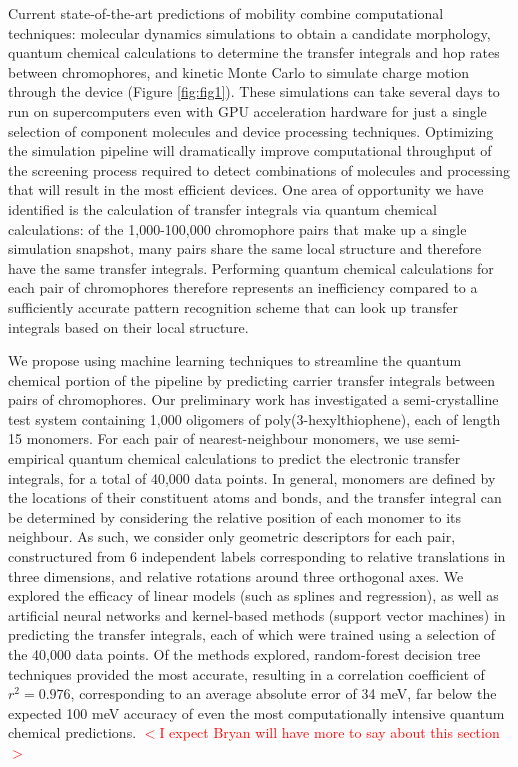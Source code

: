 \documentclass[12pt]{article}
\begin{document}
Current state-of-the-art predictions of mobility combine computational techniques: molecular dynamics simulations to obtain a candidate morphology, quantum chemical calculations to determine the transfer integrals and hop rates between chromophores, and kinetic Monte Carlo to simulate charge motion through the device (Figure \ref{fig:fig1})\cite{MorphCT,Jones2016,Jones2017}.
These simulations can take several days to run on supercomputers even with GPU acceleration hardware for just a single selection of component molecules and device processing techniques.
Optimizing the simulation pipeline will dramatically improve computational throughput of the screening process required to detect combinations of molecules and processing that will result in the most efficient devices.
One area of opportunity we have identified is the calculation of transfer integrals via quantum chemical calculations: of the 1,000-100,000 chromophore pairs that make up a single simulation snapshot, many pairs share the same local structure and therefore have the same transfer integrals.
Performing quantum chemical calculations for each pair of chromophores therefore represents an inefficiency compared to a sufficiently accurate pattern recognition scheme that can look up transfer integrals based on their local structure.

We propose using machine learning techniques to streamline the quantum chemical portion of the pipeline by predicting carrier transfer integrals between pairs of chromophores.
Our preliminary work has investigated a semi-crystalline test system containing 1,000 oligomers of poly(3-hexylthiophene), each of length 15 monomers.
For each pair of nearest-neighbour monomers, we use semi-empirical quantum chemical calculations to predict the electronic transfer integrals, for a total of 40,000 data points.
In general, monomers are defined by the locations of their constituent atoms and bonds, and the transfer integral can be determined by considering the relative position of each monomer to its neighbour.
As such, we consider only geometric descriptors for each pair, constructured from 6 independent labels corresponding to relative translations in three dimensions, and relative rotations around three orthogonal axes.
We explored the efficacy of linear models (such as splines and regression), as well as artificial neural networks and kernel-based methods (support vector machines) in predicting the transfer integrals, each of which were trained using a selection of the 40,000 data points.
Of the methods explored, random-forest decision tree techniques provided the most accurate, resulting in a correlation coefficient of $r^{2} = 0.976$, corresponding to an average absolute error of 34 meV, far below the expected 100 meV accuracy of even the most computationally intensive quantum chemical predictions.
\textcolor{red}{$<$I expect Bryan will have more to say about this section$>$}
\end{document}
